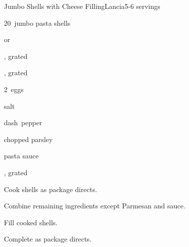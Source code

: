 \begin{recipe}{Jumbo Shells with Cheese Filling}{Lancia}{5-6 servings}

\begin{ingredients}
\item 20~jumbo pasta shells
\item {}  or 
\item \C{1\half} , grated 
\item \C{1\half} , grated 
\item 2~eggs
\item \tp{\half} salt
\item dash~pepper
\item {} chopped parsley
\item \C{3\half} pasta sauce
\item \C{\quarter} , grated 
\end{ingredients}

\begin{directions}
\item Cook shells as package directs.
\item Combine remaining ingredients except Parmesan and sauce.
\item Fill cooked shells.
\item Complete as package directs.
\end{directions}

\end{recipe}
